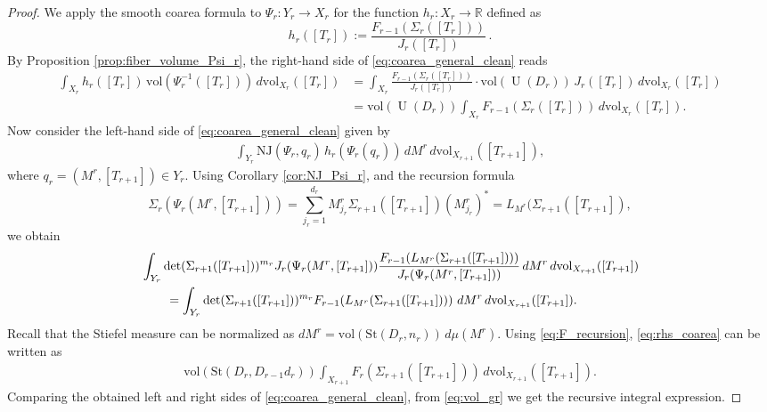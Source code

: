 \documentclass[10pt,a4paper]{amsart}
\newcommand{\NJ}{\mathrm{NJ}}
\newcommand{\R}{\mathbb{R}}
\newcommand{\St}{\mathrm{St}}
\DeclareMathOperator{\U}{U}
\newcommand{\vol}{\mathrm{vol}}
\begin{document}
\begin{proof}
We apply the smooth coarea formula to \(\Psi_r:Y_r\rightarrow X_r\) for the function $h_r:X_r\to \R$ defined as 
\begin{equation*}
h_r([T_r]):= \frac{F_{r-1}(\Sigma_r([T_r]))}{J_r([T_{r}])}\,.
\end{equation*}
By Proposition \ref{prop:fiber_volume_Psi_r}, the right-hand side of \eqref{eq:coarea_general_clean} reads
\begin{align*}
\int_{X_r}h_r([T_r])\,\vol(\Psi_r^{-1}([T_r]))\,d\vol_{X_r}([T_r]) &= \int_{X_r}
\frac{F_{r-1}(\Sigma_r([T_r]))}{ J_r([T_{r}])}
\cdot
\vol(\U(D_r))\,J_r([T_{r}])
\,d\vol_{X_r}([T_r]) \\
&= \vol(\U(D_r))
\int_{X_r}F_{r-1}(\Sigma_r([T_r]))\,d\vol_{X_r}([T_r]).
\end{align*}
Now consider the left-hand side of \eqref{eq:coarea_general_clean} given by
\begin{align*}
\int_{Y_r}
\NJ(\Psi_r,q_r)\,
h_r(\Psi_r(q_r))
\,dM^r\,d\vol_{X_{r+1}}([T_{r+1}]),
\end{align*}
where $q_r=(M^r,[T_{r+1}])\in Y_r$. Using Corollary \ref{cor:NJ_Psi_r}, and the recursion
formula
\[
\Sigma_r(\Psi_r(M^r,[T_{r+1}]))
=
\sum_{j_r=1}^{d_r}
M^r_{j_r}\Sigma_{r+1}([T_{r+1}])(M^r_{j_r})^* = L_{M^r}(\Sigma_{r+1}([T_{r+1}]),
\]
we obtain
\begin{align}
\notag &\int_{Y_r}
\det(\Sigma_{r+1}([T_{r+1}]))^{m_r}
J_r(\Psi_r(M^r,[T_{r+1}]))
\frac{
F_{r-1}\!\left(L_{M^r}(\Sigma_{r+1}([T_{r+1}]))
\right)
}{
J_r(\Psi_r(M^r,[T_{r+1}]))
}
\,dM^r\,d\vol_{X_{r+1}}([T_{r+1}]) \\ \label{eq:rhs_coarea}
&\qquad=
\int_{Y_r}
\det(\Sigma_{r+1}([T_{r+1}]))^{m_r}
F_{r-1}\!\left(L_{M^r}(\Sigma_{r+1}([T_{r+1}]))
\right)
\,dM^r\,d\vol_{X_{r+1}}([T_{r+1}]).
\end{align}
Recall that the Stiefel measure can be normalized as $dM^r=\vol(\St(D_r,n_r))\,d\mu(M^r)$. Using \eqref{eq:F_recursion}, \eqref{eq:rhs_coarea} can be written as
\begin{align*}
\vol(\St(D_r,D_{r-1}d_r))
\int_{X_{r+1}}
F_r(\Sigma_{r+1}([T_{r+1}]))\,d\vol_{X_{r+1}}([T_{r+1}]).
\end{align*}
Comparing the obtained left and right sides of \eqref{eq:coarea_general_clean}, from \eqref{eq:vol_gr} we get the recursive integral expression.
\end{proof}
\end{document}

